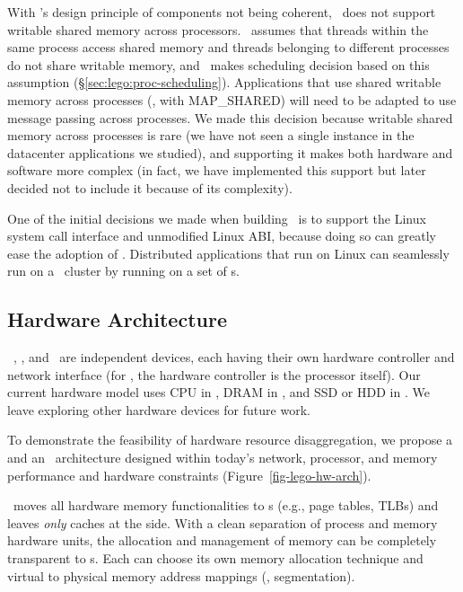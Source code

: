 With \splitkernel's design principle of components not being coherent,
\lego\ does not support writable shared memory across processors. %
\lego\ assumes that threads within the same process access shared memory
and threads belonging to different processes do not share writable memory,
and \lego\ makes scheduling decision based on this assumption (\S\ref{sec:lego:proc-scheduling}).
Applications that use shared writable memory across processes (\eg, with MAP\_SHARED)
will need to be adapted to use message passing across processes.
We made this decision because writable shared memory across processes is rare 
(we have not seen a single instance in the datacenter applications we studied),
and supporting it makes both hardware and software more complex 
(in fact, we have implemented this support but later decided not to include it because of its complexity).

One of the initial decisions we made when building \lego\ is to support the Linux system call interface 
and unmodified Linux ABI,
because doing so can greatly ease the adoption of \lego.
Distributed applications that run on Linux can seamlessly run on a \lego\ cluster
by running on a set of \vnode{}s. %

\subsection{Hardware Architecture}
\label{sec:lego:hardware}

\lego\ \pcomponent, \mcomponent, and \scomponent\ are independent devices,
each having their own hardware controller and network interface (for \pcomponent, the hardware controller is the processor itself).
Our current hardware model uses CPU in \pcomponent, 
DRAM in \mcomponent, and SSD or HDD in \scomponent.
We leave exploring other hardware devices for future work.

To demonstrate the feasibility of hardware resource disaggregation,
we propose a \pcomponent{} and an \mcomponent\ architecture designed 
within today's network, processor, and memory performance and hardware constraints
(Figure~\ref{fig-lego-hw-arch}).

\lego\ moves all hardware memory functionalities to \mcomponent{}s 
(e.g., page tables, TLBs) and leaves {\em only} caches at the \pcomponent{} side. 
With a clean separation of process and memory hardware units, 
the allocation and management of memory can be completely transparent to \pcomponent{}s.
Each \mcomponent{} can choose its own memory allocation technique
and virtual to physical memory address mappings (\eg, segmentation). 

